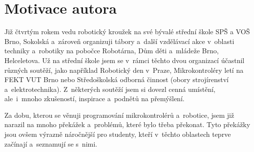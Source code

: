 
\addtocounter{footnote}{-1} %



%

\section{Motivace autora}

Již čtvrtým rokem vedu robotický kroužek na své bývalé střední škole SPŠ a VOŠ Brno, Sokolská a~zároveň organizuji tábory a~další vzdělávací akce v~oblasti techniky a~robotiky na pobočce Robotárna, Dům děti a~mládeže Brno, Helceletova.
Už na střední škole jsem se v~rámci těchto dvou organizací účastnil různých soutěží, jako například Robotický den v~Praze, Mikrokontroléry letí na FEKT VUT Brno nebo Středoškolská odborná činnost (obory strojírenství a~elektrotechnika). 
Z~některých soutěží jsem si dovezl cenná umístění, ale~i~mnoho zkušeností, inspirace a~podnětů na přemýšlení.


Za dobu, kterou se věnuji programování mikrokontrolérů a~robotice, jsem již narazil na mnoho překážek a~problémů, které bylo třeba překonat. 
Tyto překážky jsou ovšem výrazně náročnější pro studenty, kteří v~těchto oblastech teprve začínají a~seznamují se s~nimi. 

